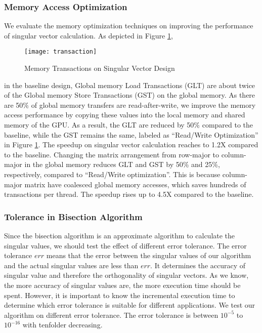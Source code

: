 \subsubsection{Memory Access Optimization}
We evaluate the memory optimization techniques on improving the performance
of singular vector calculation. As depicted in Figure \ref{fig:transaction},
\begin{figure}[hbpt]
\centering
\texttt{[image: transaction]}
\caption{Memory Transactions on Singular Vector Design}
\label{fig:transaction}
\vspace{-0.15in}
\end{figure}
in the baseline design,
Global memory Load Transactions (GLT) are about twice of the Global memory Store Transactions (GST) on the global memory.
As there are 50\% of global memory transfers are read-after-write, we improve the memory access performance by copying these values into the local memory and shared memory of the GPU. As a result, the GLT are reduced by 50\% compared to the baseline, while the GST remains the same, labeled as ``Read/Write Optimization'' in Figure \ref{fig:transaction}. The speedup on singular vector calculation reaches to 1.2X compared to the baseline.
Changing the matrix arrangement from row-major to column-major in the global memory 
reduces GLT and GST by 50\% and 25\%, respectively, compared to ``Read/Write optimization''. 
This is because column-major matrix have coalesced global memory accesses, which saves hundreds of transactions per thread. The speedup rises up to 4.5X compared to the baseline.

\subsubsection{Tolerance in Bisection Algorithm}
Since the bisection algorithm is an approximate algorithm to calculate the singular values, we should test the effect of different error tolerance.
The error tolerance $err$ means that the error between the singular values of our algorithm and the actual singular values are less than $err$.
It determines the accuracy of singular value and therefore the orthogonality of singular vectors.
As we know, the more accuracy of singular values are, the more execution time should be spent.
However, it is important to know the incremental execution time to determine which error tolerance is suitable for different applications.
We test our algorithm on different error tolerance.
The error tolerance is between $10^{-5}$ to $10^{-16}$ with tenfolder decreasing.

